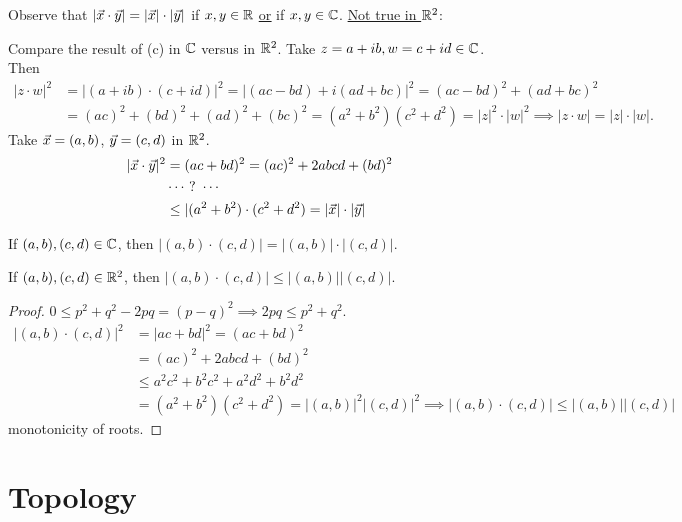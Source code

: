 \documentclass[]{article}
\begin{document}
\begin{observe}
	Observe that $|\vec{x}\cdot \vec{y}| = |\vec{x}|\cdot |\vec{y}|$ if $x,y\in\mathbb{R}$ \ul{\ul{or}} if $x,y\in\mathbb{C}$. \ul{Not true in $\mathbb{R}^2$}:
	
	Compare the result of (c) in $\mathbb{C}$ versus in $\mathbb{R}^2$.
	Take $z = a + ib,w = c+id\in\mathbb{C}$. Then
	\begin{align*}
		|z\cdot w|^2 &= |(a+ib)\cdot(c+id)|^2 = |(ac-bd) + i(ad+bc)|^2 = (ac-bd)^2 + (ad+bc)^2 \\
		&= (ac)^2 + (bd)^2 + (ad)^2 + (bc)^2 = (a^2 + b^2)(c^2+d^2) = |z|^2 \cdot |w|^2 \implies |z\cdot w| = |z|\cdot |w|.
	\end{align*}
	Take $\vec{x} = (a,b)$, $\vec{y} = (c,d)$ in $\mathbb{R}^2$.
	\begin{align*}
		|\vec{x}\cdot \vec{y}|^2 &= (ac+bd)^2 = (ac)^2 + 2abcd + (bd)^2 \\
		&\cdots\ ?\ \cdots\\
		&\leq |(a^2+b^2) \cdot (c^2+d^2) = |\vec{x}|\cdot |\vec{y}|
	\end{align*}
\end{observe}

If $(a,b),(c,d)\in\mathbb{C}$, then $|(a,b)\cdot(c,d)| = |(a,b)|\cdot|(c,d)|$.

If $(a,b),(c,d)\in\mathbb{R}^2$, then $|(a,b)\cdot(c,d)| \leq |(a,b)||(c,d)|$.
\begin{proof}
	$0\leq p^2+q^2 - 2pq = (p-q)^2 \implies 2pq \leq p^2 + q^2$.
	\begin{align*}
		|(a,b)\cdot(c,d)|^2 &= |ac+bd|^2 = (ac+bd)^2\\
				    &= (ac)^2 + 2abcd + (bd)^2 \\
		&\leq a^2c^2 + b^2c^2 + a^2d^2 + b^2d^2 \\
		&= (a^2+b^2)(c^2+d^2) = |(a,b)|^2 |(c,d)|^2 \implies |(a,b)\cdot (c,d)| \leq |(a,b)||(c,d)|
	\end{align*}
	monotonicity of roots.
\end{proof}

\section{Topology}
\end{document}
